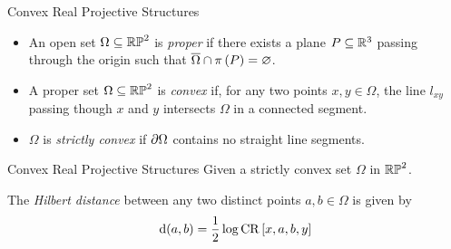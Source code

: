\documentclass{beamer}
\begin{document}
	\begin{frame}{Convex Real Projective Structures}
		\begin{definition}
			\begin{itemize}
				\item<+-> An open set $\Omega \subseteq \mathbb{RP}^2$ is \emph{proper} if there exists a plane $P \subseteq \mathbb{R}^3$ passing through the origin such that $\overline{\Omega} \cap \pi\left(P\right) = \varnothing$.
				\item<+-> A proper set $\Omega \subseteq \mathbb{RP}^2$ is \emph{convex} if, for any two points $x,y \in \Omega$, the line $l_{xy}$ passing though $x$ and $y$ intersects $\Omega$ in a connected segment.
				\item<+-> $\Omega$ is \emph{strictly convex} if $\partial \Omega$ contains no straight line segments.
			\end{itemize}
		\end{definition}
	\end{frame}
	
	\begin{frame}{Convex Real Projective Structures}
		Given a strictly convex set $\Omega$ in $\mathbb{RP}^2$.
		\begin{definition}
			The \emph{Hilbert distance} between any two distinct points $a,b \in \Omega$ is given by
			\begin{equation*}
				\operatorname{d}(a,b) =  \frac{1}{2} \log \operatorname{CR}\left[x,a,b,y\right]
			\end{equation*}
			\begin{center}
			\end{center}
		\end{definition}
	\end{frame}
	
\end{document}
